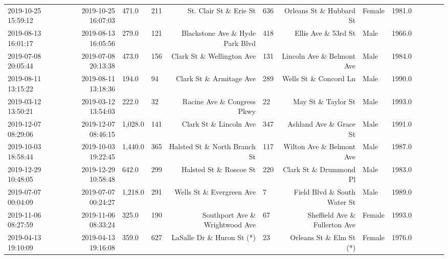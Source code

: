 \begin{table}[H]
{\begin{tabular}{lrllrlrlrlllr}
 2019-10-25 15:59:12 &  2019-10-25 16:07:03 &        471.0 &              211 &                St. Clair St \& Erie St &            636 &               Orleans St \& Hubbard St &  Female &     1981.0 \\
 2019-08-13 16:01:17 &  2019-08-13 16:05:56 &        279.0 &              121 &       Blackstone Ave \& Hyde Park Blvd &            418 &                   Ellis Ave \& 53rd St &    Male &     1966.0 \\
 2019-07-08 20:05:44 &  2019-07-08 20:13:38 &        473.0 &              156 &             Clark St \& Wellington Ave &            131 &             Lincoln Ave \& Belmont Ave &    Male &     1984.0 \\
 2019-08-11 13:15:22 &  2019-08-11 13:18:36 &        194.0 &               94 &               Clark St \& Armitage Ave &            289 &                 Wells St \& Concord Ln &    Male &     1990.0 \\
 2019-03-12 13:50:21 &  2019-03-12 13:54:03 &        222.0 &               32 &            Racine Ave \& Congress Pkwy &             22 &                    May St \& Taylor St &    Male &     1993.0 \\
 2019-12-07 08:29:06 &  2019-12-07 08:46:15 &      1,028.0 &              141 &                Clark St \& Lincoln Ave &            347 &                Ashland Ave \& Grace St &    Male &     1991.0 \\
 2019-10-03 18:58:44 &  2019-10-03 19:22:45 &      1,440.0 &              365 &          Halsted St \& North Branch St &            117 &              Wilton Ave \& Belmont Ave &    Male &     1987.0 \\
 2019-12-29 10:48:05 &  2019-12-29 10:58:48 &        642.0 &              299 &                Halsted St \& Roscoe St &            220 &                Clark St \& Drummond Pl &    Male &     1983.0 \\
 2019-07-07 00:04:09 &  2019-07-07 00:24:27 &      1,218.0 &              291 &              Wells St \& Evergreen Ave &              7 &           Field Blvd \& South Water St &    Male &     1989.0 \\
 2019-11-06 08:27:59 &  2019-11-06 08:33:24 &        325.0 &              190 &        Southport Ave \& Wrightwood Ave &             67 &         Sheffield Ave \& Fullerton Ave &  Female &     1993.0 \\
 2019-04-13 19:10:09 &  2019-04-13 19:16:08 &        359.0 &              627 &             LaSalle Dr \& Huron St (*) &             23 &               Orleans St \& Elm St (*) &  Female &     1976.0 \\

\end{tabular}}
\end{table}
